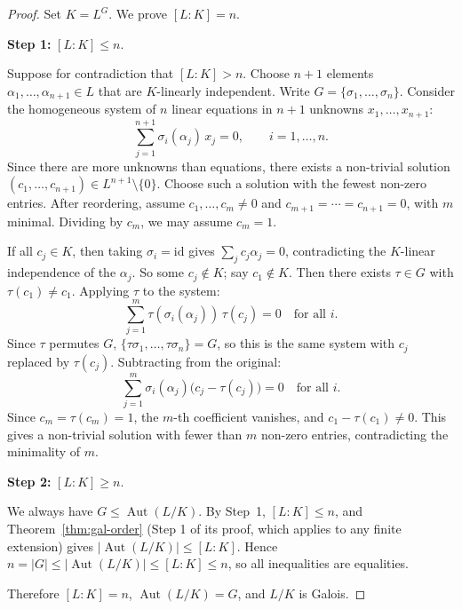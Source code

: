 \documentclass[12pt,a4paper,openany]{book}
\theoremstyle{definition}
\theoremstyle{remark}
\DeclareMathOperator{\Aut}{Aut}
\begin{document}
\begin{proof}
Set $K=L^{G}$.  We prove $[L:K]=n$.

\medskip\noindent
\textbf{Step 1:} $[L:K]\leq n$.

Suppose for contradiction that $[L:K]>n$.  Choose $n+1$ elements
$\alpha_{1},\dots,\alpha_{n+1}\in L$ that are $K$-linearly independent.
Write $G=\{\sigma_{1},\dots,\sigma_{n}\}$.  Consider the homogeneous
system of $n$ linear equations in $n+1$ unknowns $x_{1},\dots,x_{n+1}$:
\[
  \sum_{j=1}^{n+1}\sigma_{i}(\alpha_{j})\,x_{j}=0,
  \qquad i=1,\dots,n.
\]
Since there are more unknowns than equations, there exists a non-trivial
solution $(c_{1},\dots,c_{n+1})\in L^{n+1}\setminus\{0\}$.  Choose such a
solution with the fewest non-zero entries.  After reordering, assume
$c_{1},\dots,c_{m}\neq 0$ and $c_{m+1}=\cdots=c_{n+1}=0$, with $m$
minimal.  Dividing by $c_{m}$, we may assume $c_{m}=1$.

If all $c_{j}\in K$, then taking $\sigma_{i}=\mathrm{id}$ gives
$\sum_{j}c_{j}\alpha_{j}=0$, contradicting the $K$-linear independence of
the $\alpha_{j}$.  So some $c_{j}\notin K$; say $c_{1}\notin K$.  Then
there exists $\tau\in G$ with $\tau(c_{1})\neq c_{1}$.  Applying $\tau$ to
the system:
\[
  \sum_{j=1}^{m}\tau(\sigma_{i}(\alpha_{j}))\,\tau(c_{j})=0
  \quad\text{for all }i.
\]
Since $\tau$ permutes $G$, $\{\tau\sigma_{1},\dots,\tau\sigma_{n}\}=G$, so
this is the same system with $c_{j}$ replaced by $\tau(c_{j})$.
Subtracting from the original:
\[
  \sum_{j=1}^{m}\sigma_{i}(\alpha_{j})\bigl(c_{j}-\tau(c_{j})\bigr)=0
  \quad\text{for all }i.
\]
Since $c_{m}=\tau(c_{m})=1$, the $m$-th coefficient vanishes, and
$c_{1}-\tau(c_{1})\neq 0$.  This gives a non-trivial solution with fewer
than $m$ non-zero entries, contradicting the minimality of $m$.

\medskip\noindent
\textbf{Step 2:} $[L:K]\geq n$.

We always have $G\leq\Aut(L/K)$.  By Step~1, $[L:K]\leq n$, and
Theorem~\ref{thm:gal-order} (Step 1 of its proof, which applies to any
finite extension) gives $|\!\Aut(L/K)|\leq[L:K]$.  Hence
$n=|G|\leq|\!\Aut(L/K)|\leq[L:K]\leq n$, so all inequalities are
equalities.

\medskip
Therefore $[L:K]=n$, $\Aut(L/K)=G$, and $L/K$ is Galois.
\end{proof}
\end{document}
